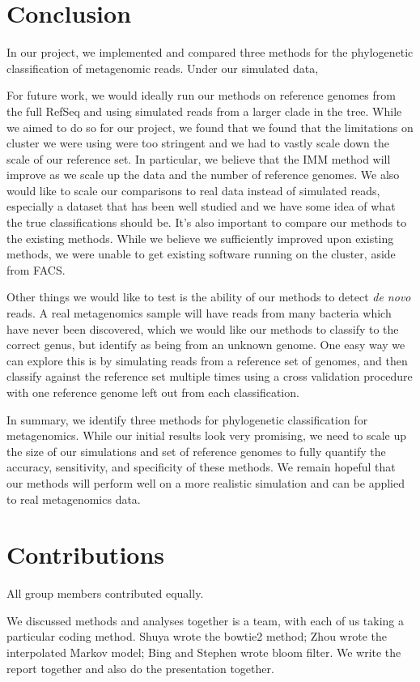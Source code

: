 \documentclass[12pt]{article} %
\begin{document}
\section{Conclusion}
In our project, we implemented and compared three methods for the phylogenetic classification of metagenomic reads. Under our simulated data, 
\par
For future work, we would ideally run our methods on reference genomes from the full RefSeq and using simulated reads from a larger clade in the tree. While we aimed to do so for our project, we found that we found that the limitations on cluster we were using were too stringent and we had to vastly scale down the scale of our reference set. In particular, we believe that the IMM method will improve as we scale up the data and the number of reference genomes. We also would like to scale our comparisons to real data instead of simulated reads, especially a dataset that has been well studied and we have some idea of what the true classifications should be. It's also important to compare our methods to the existing methods. While we believe we sufficiently improved upon existing methods, we were unable to get existing software running on the cluster, aside from FACS. 
\par
Other things we would like to test is the ability of our methods to detect \emph{de novo} reads. A real metagenomics sample will have reads from many bacteria which have never been discovered, which we would like our methods to classify to the correct genus, but identify as being from an unknown genome. One easy way we can explore this is by simulating reads from a reference set of genomes, and then classify against the reference set multiple times using a cross validation procedure with one reference genome left out from each classification.
\par
In summary, we identify three methods for phylogenetic classification for metagenomics. While our initial results  look very promising, we need to scale up the size of our simulations and set of reference genomes to fully quantify the accuracy, sensitivity, and specificity of these methods. We remain hopeful that our methods will perform well on a more realistic simulation and can be applied to real metagenomics data. 
\section*{Contributions}
All group members contributed equally.
\par
We discussed methods and analyses together is a team, with each of us taking a particular coding method. Shuya wrote the bowtie2 method; Zhou wrote the interpolated Markov model; Bing and Stephen wrote bloom filter. We write the report together and also do the presentation together. 
\end{document}
